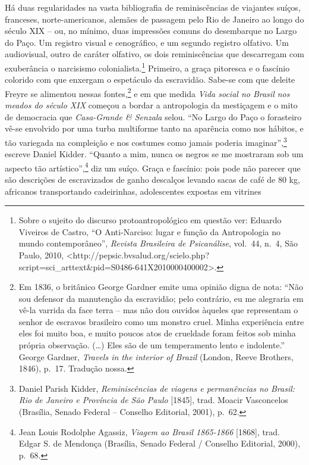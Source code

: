 Há duas regularidades na vasta bibliografia de reminiscências de
viajantes suíços, franceses, norte-americanos, alemães de passagem pelo
Rio de Janeiro ao longo do século XIX -- ou, no mínimo, duas impressões
comuns do desembarque no Largo do Paço. Um registro visual e
cenográfico, e um segundo registro olfativo. Um audiovisual, outro de
caráter olfativo, os dois reminiscências que descarregam com exuberância
o narcisismo colonialista.\footnote{Sobre o sujeito do discurso
  protoantropológico em questão ver: Eduardo Viveiros de Castro, ``O
  Anti-Narciso: lugar e função da Antropologia no mundo contemporâneo'',
  \emph{Revista Brasileira de Psicanálise}, vol.~44, n.~4, São Paulo,
  2010,
  \textless{}http://pepsic.bvsalud.org/scielo.php?script=sci\_arttext\&pid=S0486-641X2010000400002\textgreater{}.}
Primeiro, a graça pitoresca e o fascínio colorido com que enxergam o
espetáculo da escravidão. Sabe-se com que deleite Freyre se alimentou
nessas fontes,\footnote{Em 1836, o britânico George Gardner emite uma
  opinião digna de nota: ``Não sou defensor da manutenção da escravidão;
  pelo contrário, eu me alegraria em vê-la varrida da face terra -- mas
  não dou ouvidos àqueles que representam o senhor de escravos
  brasileiro como um monstro cruel. Minha experiência entre eles foi
  muito boa, e muito poucos atos de crueldade foram feitos sob minha
  própria observação. (\ldots{}) Eles são de um temperamento lento e
  indolente.'' George Gardner, \emph{Travels in the interior of Brazil}
  (London, Reeve Brothers, 1846), p.~17. Tradução nossa.} e em que
medida \emph{Vida social no Brasil nos meados do século XIX} começou a
bordar a antropologia da mestiçagem e o mito de democracia que
\emph{Casa-Grande \& Senzala} selou. ``No Largo do Paço o forasteiro
vê-se envolvido por uma turba multiforme tanto na aparência como nos
hábitos, e tão variegada na compleição e nos costumes como jamais
poderia imaginar'',\footnote{Daniel Parish Kidder, \emph{Reminiscências
  de viagens e permanências no Brasil: Rio de Janeiro e Província de São
  Paulo} {[}1845{]}, trad. Moacir Vasconcelos (Brasília, Senado Federal
  -- Conselho Editorial, 2001), p.~62.} escreve Daniel Kidder. ``Quanto
a mim, nunca os negros se me mostraram sob um aspecto tão
artístico'',\footnote{Jean Louis Rodolphe Agassiz, \emph{Viagem ao
  Brasil 1865-1866} {[}1868{]}, trad. Edgar S. de Mendonça (Brasília,
  Senado Federal / Conselho Editorial, 2000), p.~68.} diz um suíço.
Graça e fascínio: pois pode não parecer que são descrições de
escravizados de ganho descalços levando sacas de café de 80 kg,
africanos transportando cadeirinhas, adolescentes expostas em vitrines
